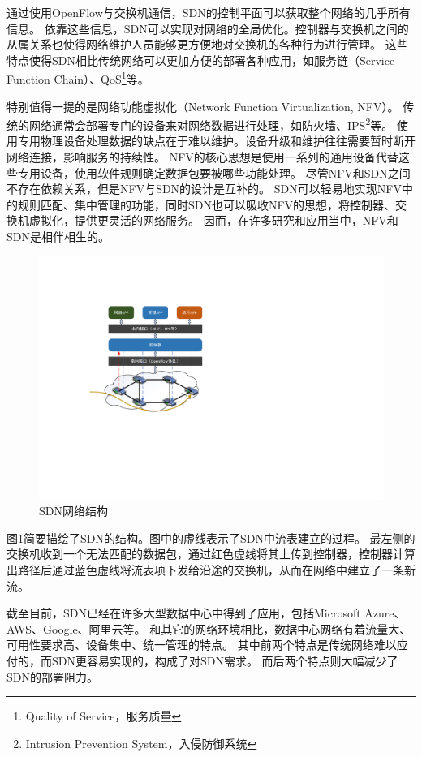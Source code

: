通过使用OpenFlow与交换机通信，SDN的控制平面可以获取整个网络的几乎所有信息。
依靠这些信息，SDN可以实现对网络的全局优化。控制器与交换机之间的从属关系也使得网络维护人员能够更方便地对交换机的各种行为进行管理。
这些特点使得SDN相比传统网络可以更加方便的部署各种应用，如服务链（Service Function Chain）\cite{halpern2015service}、QoS\footnote{Quality of Service，服务质量}\cite{akella2014quality}等。

特别值得一提的是网络功能虚拟化（Network Function Virtualization, NFV）。
传统的网络通常会部署专门的设备来对网络数据进行处理，如防火墙、IPS\footnote{Intrusion Prevention System，入侵防御系统}等。
使用专用物理设备处理数据的缺点在于难以维护。设备升级和维护往往需要暂时断开网络连接，影响服务的持续性。
NFV的核心思想是使用一系列的通用设备代替这些专用设备，使用软件规则确定数据包要被哪些功能处理。
尽管NFV和SDN之间不存在依赖关系，但是NFV与SDN的设计是互补的。
SDN可以轻易地实现NFV中的规则匹配、集中管理的功能，同时SDN也可以吸收NFV的思想，将控制器、交换机虚拟化，提供更灵活的网络服务。
因而，在许多研究和应用当中，NFV和SDN是相伴相生的。

\begin{figure}[ht]
	\centering
	\includegraphics[width=0.8\linewidth]{fig/sdn.pdf}
	\caption{SDN网络结构}\label{fig:sdn}
\end{figure}

图\ref{fig:sdn}简要描绘了SDN的结构。图中的虚线表示了SDN中流表建立的过程。
最左侧的交换机收到一个无法匹配的数据包，通过红色虚线将其上传到控制器，控制器计算出路径后通过蓝色虚线将流表项下发给沿途的交换机，从而在网络中建立了一条新流。

截至目前，SDN已经在许多大型数据中心中得到了应用，包括Microsoft Azure、AWS、Google、阿里云等。
和其它的网络环境相比，数据中心网络有着流量大、可用性要求高、设备集中、统一管理的特点。
其中前两个特点是传统网络难以应付的，而SDN更容易实现的，构成了对SDN需求。
而后两个特点则大幅减少了SDN的部署阻力。

